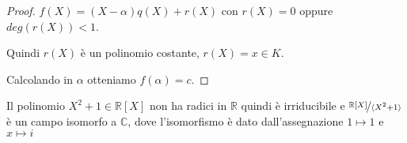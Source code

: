 \documentclass[../main.tex]{subfiles}
\begin{document}
\begin{proof}
    $f(X) = (X - \alpha) q(X) + r(X)$ con $r(X) = 0$ oppure $deg(r(X)) < 1$.

    Quindi $r(X)$ è un polinomio costante, $r(X) = x \in K$.

    Calcolando in $\alpha$ otteniamo $f(\alpha) = c$.
\end{proof}

\begin{example}
    Il polinomio $X^2 + 1 \in \mathbb{R}[X]$ non ha radici in $\mathbb{R}$ quindi è irriducibile e $\nicefrac{\mathbb{R}[X]}{\langle X^2 + 1\rangle}$ è un campo isomorfo a $\mathbb{C}$, dove l'isomorfismo è dato dall'assegnazione $1 \mapsto 1$ e $x \mapsto i$
\end{example}
\end{document}
